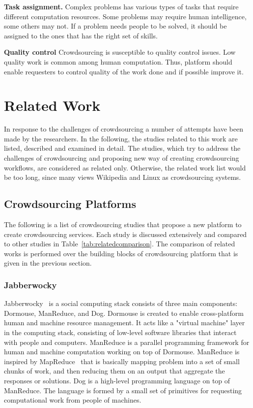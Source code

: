 \textbf{Task assignment.} Complex problems has various types of tasks that require 
different computation resources. Some problems may require human intelligence, some 
others may not. If a problem needs people to be solved, it should be assigned to the ones 
that has the right set of skills.

\textbf{Quality control} Crowdsourcing is susceptible to quality control issues. Low quality 
work is common among human computation. Thus, platform should enable requesters 
to control quality of the work done and if possible improve it.




\section{Related Work}
In response to the challenges of crowdsourcing a number of attempts have been made 
by the researchers. In the following, the studies related to this work are listed, 
described and examined in detail. The studies, which try to address the challenges of 
crowdsourcing and proposing new way of creating crowdsourcing workflows, are
considered as related only. Otherwise, the related work list would be too long, 
since many views Wikipedia and Linux as crowdsourcing systems.


\subsection{Crowdsourcing Platforms}
The following is a list of crowdsourcing studies that propose a new platform 
to create crowdsourcing services. Each study is discussed extensively 
and compared to other studies in Table~\ref{tab:relatedcomparison}. 
The comparison of related works is performed over the building blocks of 
crowdsourcing platform that is given in the previous section.


\subsubsection{Jabberwocky}
Jabberwocky~\cite{Ahmad2011} is a social computing stack consists of three 
main components: Dormouse, ManReduce, and Dog. Dormouse is created to 
enable cross-platform human and machine resource management. It acts like a 
"virtual machine" layer in the computing stack, consisting of low-level software 
libraries that interact with people and computers. ManReduce is a parallel 
programming framework for human and machine computation working on top 
of Dormouse. ManReduce is inspired by MapReduce~\cite{Dean2008} that is 
basically mapping problem into a set of small chunks of work, and then reducing 
them on an output that aggregate the responses or solutions. Dog is a high-level 
programming language on top of ManReduce. The language is formed by a small 
set of primitives for requesting computational work from people of machines. 

